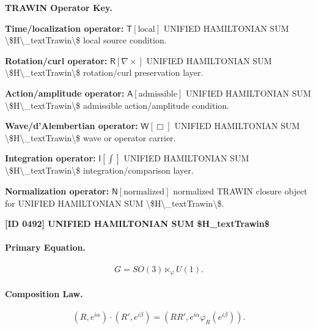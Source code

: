 \par\vspace{0.45\baselineskip}
\noindent\begin{minipage}[t]{\linewidth}
\begingroup
\small
\raggedright
\textbf{TRAWIN Operator Key.}\par
\noindent\textbf{Time/localization operator:} $\mathsf{T}\!\left[\mathrm{local}\right]$ UNIFIED HAMILTONIAN SUM \textbackslash{}\$H\textbackslash{}\_textTrawin\textbackslash{}\$ local source condition.\par
\noindent\textbf{Rotation/curl operator:} $\mathsf{R}\!\left[\nabla\times\right]$ UNIFIED HAMILTONIAN SUM \textbackslash{}\$H\textbackslash{}\_textTrawin\textbackslash{}\$ rotation/curl preservation layer.\par
\noindent\textbf{Action/amplitude operator:} $\mathsf{A}\!\left[\mathrm{admissible}\right]$ UNIFIED HAMILTONIAN SUM \textbackslash{}\$H\textbackslash{}\_textTrawin\textbackslash{}\$ admissible action/amplitude condition.\par
\noindent\textbf{Wave/d'Alembertian operator:} $\mathsf{W}\!\left[\Box\right]$ UNIFIED HAMILTONIAN SUM \textbackslash{}\$H\textbackslash{}\_textTrawin\textbackslash{}\$ wave or operator carrier.\par
\noindent\textbf{Integration operator:} $\mathsf{I}\!\left[\int\right]$ UNIFIED HAMILTONIAN SUM \textbackslash{}\$H\textbackslash{}\_textTrawin\textbackslash{}\$ integration/comparison layer.\par
\noindent\textbf{Normalization operator:} $\mathsf{N}\!\left[\mathrm{normalized}\right]$ normalized TRAWIN closure object for UNIFIED HAMILTONIAN SUM \textbackslash{}\$H\textbackslash{}\_textTrawin\textbackslash{}\$.\par
\endgroup
\end{minipage}

\clearpage
\noindent\textbf{[ID 0492] UNIFIED HAMILTONIAN SUM \$H\_textTrawin\$}\par
\vspace{0.35em}
\paragraph{Primary Equation.}
\begin{equation}
G=SO(3)\ltimes_{\varphi} U(1).
\end{equation}

\paragraph{Composition Law.}
\begin{equation}
(R,e^{i\alpha})\cdot(R',e^{i\beta})
=
\left(
RR',
e^{i\alpha}\varphi_R(e^{i\beta})
\right).
\end{equation}

